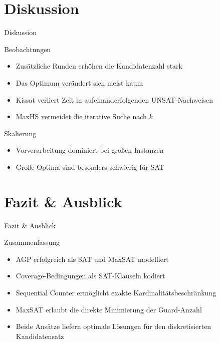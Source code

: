 \documentclass[11pt,aspectratio=169]{beamer}
\begin{document}
\fi

\section{Diskussion}
\begin{frame}{Diskussion}

\begin{block}{Beobachtungen}
\begin{itemize}
  \item Zusätzliche Runden erhöhen die Kandidatenzahl stark
  \item Das Optimum verändert sich meist kaum
  \item Kissat verliert Zeit in aufeinanderfolgenden UNSAT-Nachweisen
  \item MaxHS vermeidet die iterative Suche nach $k$
\end{itemize}
\end{block}

\begin{block}{Skalierung}
\begin{itemize}
  \item Vorverarbeitung dominiert bei großen Instanzen
  \item Große Optima sind besonders schwierig für SAT
\end{itemize}
\end{block}

\end{frame}



\section{Fazit \& Ausblick}

\begin{frame}{Fazit \& Ausblick}
    \begin{block}{Zusammenfassung}
        \begin{itemize}
            \item AGP erfolgreich als SAT und MaxSAT modelliert
            \item Coverage-Bedingungen als SAT-Klauseln kodiert
            \item Sequential Counter ermöglicht exakte Kardinalitätsbeschränkung
            \item MaxSAT erlaubt die direkte Minimierung der Guard-Anzahl
            \item Beide Ansätze liefern optimale Lösungen für den diskretisierten Kandidatensatz
        \end{itemize}
    \end{block}
\end{frame}
\end{document}
